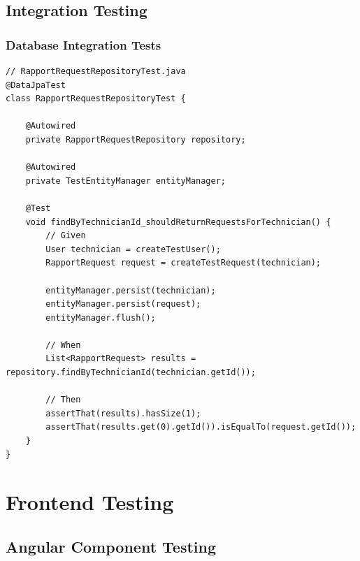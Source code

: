 \subsection{Integration Testing}

\subsubsection{Database Integration Tests}

\begin{lstlisting}
// RapportRequestRepositoryTest.java
@DataJpaTest
class RapportRequestRepositoryTest {

    @Autowired
    private RapportRequestRepository repository;

    @Autowired
    private TestEntityManager entityManager;

    @Test
    void findByTechnicianId_shouldReturnRequestsForTechnician() {
        // Given
        User technician = createTestUser();
        RapportRequest request = createTestRequest(technician);

        entityManager.persist(technician);
        entityManager.persist(request);
        entityManager.flush();

        // When
        List<RapportRequest> results = repository.findByTechnicianId(technician.getId());

        // Then
        assertThat(results).hasSize(1);
        assertThat(results.get(0).getId()).isEqualTo(request.getId());
    }
}
\end{lstlisting}

\section{Frontend Testing}

\subsection{Angular Component Testing}


